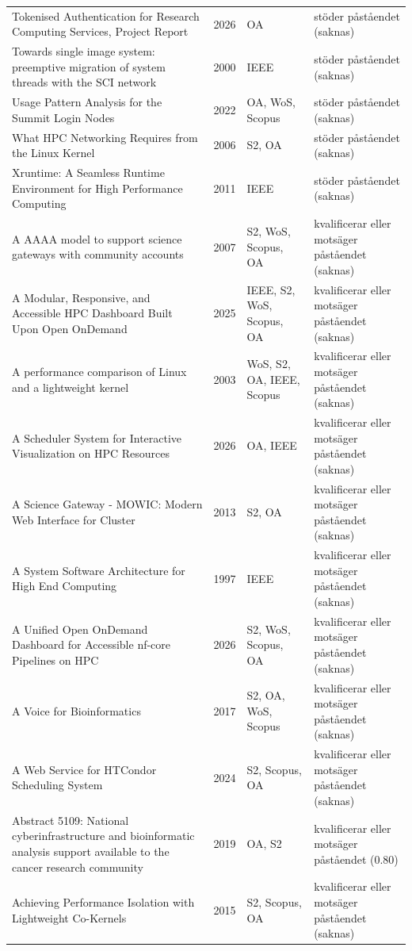 \begin{longtable}{@{}%
  >{\raggedright\arraybackslash}p{}c%
  >{\raggedright\arraybackslash}p{}%
  >{\raggedright\arraybackslash}p{}@{}}
Tokenised Authentication for Research Computing Services, Project Report & 2026 & OA & stöder påståendet (saknas) \\
Towards single image system: preemptive migration of system threads with the SCI network & 2000 & IEEE & stöder påståendet (saknas) \\
Usage Pattern Analysis for the Summit Login Nodes & 2022 & OA, WoS, Scopus & stöder påståendet (saknas) \\
What HPC Networking Requires from the Linux Kernel & 2006 & S2, OA & stöder påståendet (saknas) \\
Xruntime: A Seamless Runtime Environment for High Performance Computing & 2011 & IEEE & stöder påståendet (saknas) \\
A AAAA model to support science gateways with community accounts & 2007 & S2, WoS, Scopus, OA & kvalificerar eller motsäger påståendet (saknas) \\
A Modular, Responsive, and Accessible HPC Dashboard Built Upon Open OnDemand & 2025 & IEEE, S2, WoS, Scopus, OA & kvalificerar eller motsäger påståendet (saknas) \\
A performance comparison of Linux and a lightweight kernel & 2003 & WoS, S2, OA, IEEE, Scopus & kvalificerar eller motsäger påståendet (saknas) \\
A Scheduler System for Interactive Visualization on HPC Resources & 2026 & OA, IEEE & kvalificerar eller motsäger påståendet (saknas) \\
A Science Gateway - MOWIC: Modern Web Interface for Cluster & 2013 & S2, OA & kvalificerar eller motsäger påståendet (saknas) \\
A System Software Architecture for High End Computing & 1997 & IEEE & kvalificerar eller motsäger påståendet (saknas) \\
A Unified Open OnDemand Dashboard for Accessible nf-core Pipelines on HPC & 2026 & S2, WoS, Scopus, OA & kvalificerar eller motsäger påståendet (saknas) \\
A Voice for Bioinformatics & 2017 & S2, OA, WoS, Scopus & kvalificerar eller motsäger påståendet (saknas) \\
A Web Service for HTCondor Scheduling System & 2024 & S2, Scopus, OA & kvalificerar eller motsäger påståendet (saknas) \\
Abstract 5109: National cyberinfrastructure and bioinformatic analysis support available to the cancer research community & 2019 & OA, S2 & kvalificerar eller motsäger påståendet (0.80) \\
Achieving Performance Isolation with Lightweight Co-Kernels & 2015 & S2, Scopus, OA & kvalificerar eller motsäger påståendet (saknas) \\

\end{longtable}
